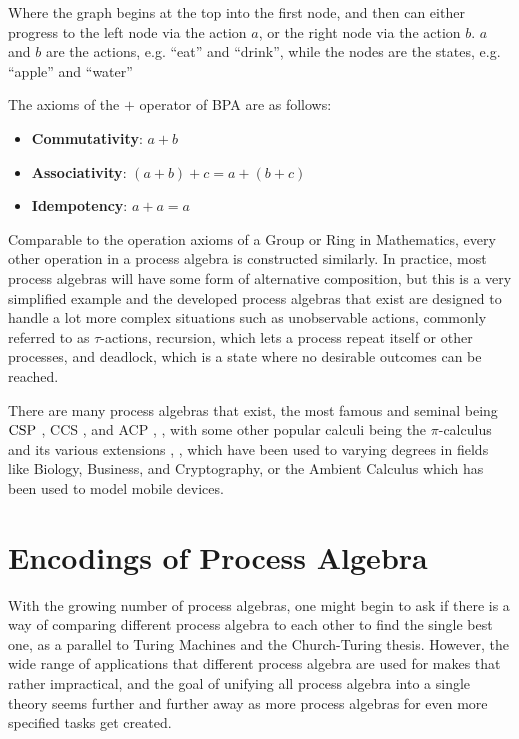 \documentclass[../hons_project.tex]{subfiles}
\begin{document}
Where the graph begins at the top into the first node, and then can either progress to the left node via the action $a$, or the right node via the action $b$. $a$ and $b$ are the actions, e.g. ``eat'' and ``drink'', while the nodes are the states, e.g. ``apple'' and ``water''

The axioms of the $+$ operator of BPA are as follows:
\begin{itemize}
    \item \textbf{Commutativity}: $a + b$
    \item \textbf{Associativity}: $(a + b) + c = a + (b + c)$
    \item \textbf{Idempotency}: $a + a = a$
\end{itemize}
Comparable to the operation axioms of a Group or Ring in Mathematics, every other operation in a process algebra is constructed similarly. In practice, most process algebras will have some form of alternative composition, but this is a very simplified example and the developed process algebras that exist are designed to handle a lot more complex situations such as unobservable actions, commonly referred to as $\tau$-actions, recursion, which lets a process repeat itself or other processes, and deadlock, which is a state where no desirable outcomes can be reached.

There are many process algebras that exist, the most famous and seminal being $\mathrm{CSP}$ \citep{brookesTheoryCommunicatingSequential1984}, CCS \citep{milnerCalculusCommunicatingSystems1980}, and ACP \citep{bergstraProcessAlgebraSynchronous1984}, \citep{bergstraACPtUniversalAxiom1989}, with some other popular calculi being the $\pi$-calculus and its various extensions  \citep{MILNER19921}, \citep{parrowFusionCalculusExpressiveness1998}, \citep{abadiCalculusCryptographicProtocols1999} which have been used to varying degrees in fields like Biology, Business, and Cryptography, or the Ambient Calculus \citep{cardelliMobileAmbients1998} which has been used to model mobile devices.

\section{Encodings of Process Algebra}

With the growing number of process algebras, one might begin to ask if there is a way of comparing different process algebra to each other to find the single best one, as a parallel to Turing Machines and the Church-Turing thesis. However, the wide range of applications that different process algebra are used for makes that rather impractical, and the goal of unifying all process algebra into a single theory seems further and further away as more process algebras for even more specified tasks get created.
\end{document}
